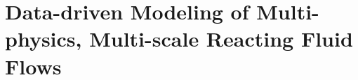 \chapter{Data-driven Modeling of Multi-physics, Multi-scale Reacting Fluid Flows}
\label{chap:Overview}







